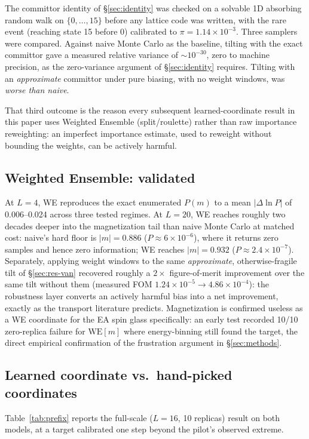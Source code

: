 \documentclass[a4paper,fleqn]{cas-sc}
\let\Oldsubsection\subsection
\renewcommand{\subsection}{\FloatBarrier\Oldsubsection}
\begin{document}
	The committor identity of \S\ref{sec:identity} was checked on a solvable 1D absorbing
	random walk on $\{0,\dots,15\}$ before any lattice code was written, with the rare event
	(reaching state 15 before 0) calibrated to $\pi=1.14\times10^{-3}$. Three samplers were
	compared. Against naive Monte Carlo as the baseline, tilting with the exact committor gave
	a measured relative variance of ${\sim}10^{-30}$, zero to machine precision, as the
	zero-variance argument of \S\ref{sec:identity} requires. Tilting with an
	\emph{approximate} committor under pure biasing, with no weight windows, was
	\emph{worse than naive}.
	
	That third outcome is the reason every subsequent learned-coordinate result in this paper
	uses Weighted Ensemble (split/roulette) rather than raw importance reweighting: an
	imperfect importance estimate, used to reweight without bounding the weights, can be
	actively harmful.
	
	\subsection{Weighted Ensemble: validated}\label{sec:res-we}
	At $L=4$, WE reproduces the exact enumerated $P(m)$ to a mean $|\Delta\ln P|$ of
	0.006--0.024 across three tested regimes. At $L=20$, WE reaches roughly two decades deeper
	into the magnetization tail than naive Monte Carlo at matched cost: naive's hard floor is
	$|m|=0.886$ ($P\approx6\times10^{-6}$), where it returns zero samples and hence zero
	information; WE reaches $|m|=0.932$ ($P\approx2.4\times10^{-7}$). Separately, applying
	weight windows to the same \emph{approximate}, otherwise-fragile tilt of
	\S\ref{sec:res-van} recovered roughly a $2\times$ figure-of-merit improvement
	over the same tilt without them (measured FOM $1.24\times10^{-5}\to4.86\times10^{-4}$):
	the robustness layer converts an actively harmful bias into a net improvement, exactly as
	the transport literature predicts. Magnetization is confirmed useless as a WE coordinate
	for the EA spin glass specifically: an early test recorded 10/10 zero-replica failure for
	$\mathrm{WE}[m]$ where energy-binning still found the target, the direct empirical
	confirmation of the frustration argument in \S\ref{sec:methods}.
	
	\subsection{Learned coordinate vs.\ hand-picked coordinates}\label{sec:res-learned}
	Table~\ref{tab:prefix} reports the full-scale ($L=16$, 10 replicas) result on both models,
	at a target calibrated one step beyond the pilot's observed extreme.
	
\end{document}
